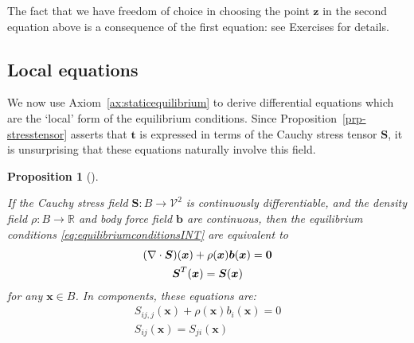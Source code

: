\documentclass[
  letterpaper,
  DIV=11,
  numbers=noendperiod]{scrreprt}
\theoremstyle{plain}
\newtheorem{proposition}{Proposition}[chapter]
\theoremstyle{remark}
\begin{document}
The fact that we have freedom of choice in choosing the point
\({\boldsymbol{z}}\) in the second equation above is a consequence of
the first equation: see Exercises for details.

\subsection{Local equations}\label{local-equations}

We now use
Axiom~\hyperref[ax:staticequilibrium]{{[}ax:staticequilibrium{]}} to
derive differential equations which are the `local' form of the
equilibrium conditions. Since Proposition~\ref{prp-stresstensor} asserts
that \({\boldsymbol{t}}\) is expressed in terms of the Cauchy stress
tensor \({\boldsymbol{S}}\), it is unsurprising that these equations
naturally involve this field.

\begin{proposition}[]\protect\hypertarget{prp-staticequilibriumeqns}{}\label{prp-staticequilibriumeqns}

If the Cauchy stress field \({\boldsymbol{S}}:B\to{\mathcal{V}}^2\) is
continuously differentiable, and the density field
\(\rho:B\to{\mathbb{R}}\) and body force field \({\boldsymbol{b}}\) are
continuous, then the equilibrium conditions
\hyperref[eq:equilibriumconditionsINT]{{[}eq:equilibriumconditionsINT{]}}
are equivalent to \[\label{eq:equilibriumequationsDE}
    \begin{gathered}
      (\nabla\cdot{\boldsymbol{S}})({\boldsymbol{x}})+\rho({\boldsymbol{x}}){\boldsymbol{b}}({\boldsymbol{x}}) = \bf0 \\
      {\boldsymbol{S}}^T({\boldsymbol{x}})={\boldsymbol{S}}({\boldsymbol{x}})
    \end{gathered}\] for any \({\boldsymbol{x}}\in B\). In components,
these equations are: \[\begin{gathered}
      S_{ij,j}({\boldsymbol{x}})+\rho({\boldsymbol{x}})b_i({\boldsymbol{x}}) = 0 \\
      S_{ij}({\boldsymbol{x}})=S_{ji}({\boldsymbol{x}})
    \end{gathered}\]

\end{proposition}
\end{document}
